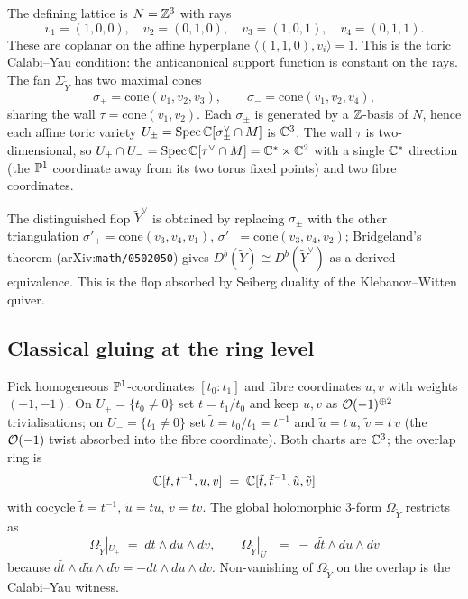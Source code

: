 The defining lattice is $N = \mathbb{Z}^{3}$ with rays
\[
  v_{1}=(1,0,0),\quad v_{2}=(0,1,0),\quad v_{3}=(1,0,1),\quad v_{4}=(0,1,1).
\]
These are coplanar on the affine hyperplane
$\langle (1,1,0),v_i\rangle=1$.  This is the toric Calabi--Yau
condition: the anticanonical support function is constant on the rays.
The fan $\Sigma_{\widetilde{Y}}$ has
two maximal cones
\[
  \sigma_{+} = \mathrm{cone}(v_{1},v_{2},v_{3}), \qquad
  \sigma_{-} = \mathrm{cone}(v_{1},v_{2},v_{4}),
\]
sharing the wall $\tau = \mathrm{cone}(v_{1},v_{2})$.  Each
$\sigma_{\pm}$ is generated by a $\mathbb{Z}$-basis of $N$, hence each affine
toric variety $U_{\pm} = \mathrm{Spec}\,\mathbb{C}[\sigma_{\pm}^{\vee}\cap M]$
is $\mathbb{C}^{3}$.  The wall $\tau$ is two-dimensional, so
$U_{+}\cap U_{-} = \mathrm{Spec}\,\mathbb{C}[\tau^{\vee}\cap M] = \mathbb{C}^{*}\times\mathbb{C}^{2}$
with a single $\mathbb{C}^{*}$ direction (the $\mathbb{P}^{1}$ coordinate away from its
two torus fixed points) and two fibre coordinates.

The distinguished flop $\widetilde{Y}^{\vee}$ is obtained by replacing
$\sigma_{\pm}$ with the other triangulation
$\sigma'_+=\mathrm{cone}(v_{3},v_{4},v_{1})$,
$\sigma'_-=\mathrm{cone}(v_{3},v_{4},v_{2})$;
Bridgeland's theorem
(arXiv:\texttt{math/0502050}) gives $D^{b}(\widetilde{Y})\cong
D^{b}(\widetilde{Y}^{\vee})$ as a derived equivalence.  This is the
flop absorbed by Seiberg duality of the Klebanov--Witten quiver.

\subsection*{Classical gluing at the ring level}

Pick homogeneous $\mathbb{P}^{1}$-coordinates $[t_{0}:t_{1}]$
and fibre coordinates $u,v$ with weights $(-1,-1)$.  On
$U_{+}=\{t_{0}\neq 0\}$ set $t = t_{1}/t_{0}$ and keep $u,v$ as
$\mathcal{O}(-1)^{\oplus 2}$ trivialisations; on
$U_{-}=\{t_{1}\neq 0\}$ set $\tilde t = t_{0}/t_{1} = t^{-1}$ and
$\tilde u = t\,u$, $\tilde v = t\,v$ (the $\mathcal{O}(-1)$ twist absorbed into
the fibre coordinate).  Both charts are $\mathbb{C}^{3}$; the overlap ring is
\[
  \mathbb{C}[t,t^{-1},u,v] \;=\; \mathbb{C}[\tilde t,\tilde t^{-1}, \tilde u,\tilde v]
\]
with cocycle $\tilde t = t^{-1}$, $\tilde u = t u$, $\tilde v = t v$.
The global holomorphic $3$-form $\Omega_{\widetilde{Y}}$ restricts as
\[
  \Omega_{\widetilde{Y}}|_{U_{+}} \;=\; dt\wedge du\wedge dv, \qquad
  \Omega_{\widetilde{Y}}|_{U_{-}} \;=\; -\,d\tilde t\wedge d\tilde u\wedge d\tilde v
\]
because
$d\tilde t\wedge d\tilde u\wedge d\tilde v=-dt\wedge du\wedge dv$.
Non-vanishing of $\Omega_{\widetilde Y}$ on the overlap is the
Calabi--Yau witness.

